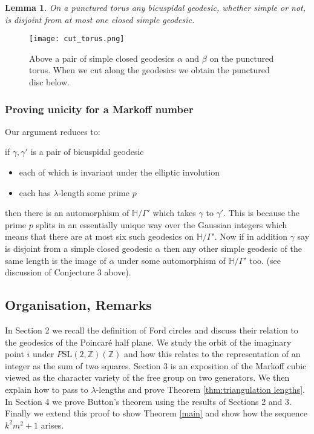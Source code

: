 \documentclass[12pt,a4paper]{amsart}
\newtheorem{lem}[thm]{Lemma}
\def\HH{\mathbb{H}}
\def\xx{\HH/\Gamma'}
\def\ZZ{\mathbb{Z}}
\def\sl2{\mathrm{SL}(2, \ZZ)}
\begin{document}
\begin{lem}\label{lem: labelling}
On a punctured torus any bicuspidal geodesic, whether simple or not, is
disjoint from at most one closed simple geodesic.
\end{lem}

\begin{figure}[ht]
\begin{center}
\texttt{[image: cut\_torus.png]}
\end{center}

\caption{Above a pair of simple closed geodesics $\alpha$ and $\beta$ on the
punctured torus. When we cut along the geodesics we obtain the punctured disc
below.}

	\label{fig: cut torus}
\end{figure}

\subsubsection{Proving unicity for a Markoff number} 
Our argument reduces to:

if $\gamma, \gamma'$ is a pair of  bicuspidal geodesic 

\begin{itemize}	
\item each of which is invariant under the elliptic involution 
\item each has  $\lambda$-length some prime $p$ 
\end{itemize}	

then there is an automorphism of $\xx$ which takes $\gamma$ to $\gamma'$. This
is because  the prime $p$ splits in an essentially unique way over the Gaussian
integers which means that there are at most six such geodesics on $\xx$. Now if
in addition $\gamma$ say is disjoint from a simple closed geodesic $\alpha$ then
any other simple geodesic of the same length is the image of $\alpha$ under
some automorphism of $\xx$ too. (see discussion of Conjecture 3 \cite{mcp}
above).

\subsection{Organisation, Remarks}

In Section 2 we recall the definition of Ford circles and discuss their
relation to the geodesics of the Poincaré half plane. We study the orbit of the
imaginary point $i$ under $P\sl2(\ZZ)$ and how this relates to the
representation of an integer as the sum of two squares. Section 3  is an
exposition of the Markoff cubic viewed as the character variety of the free
group on two generators. We then explain how to pass to $\lambda$-lengths and
prove Theorem \ref{thm:triangulation lengths}. In Section 4 we prove Button's
theorem using the results of Sections 2 and  3.  Finally we extend this proof
to show Theorem \ref{main} and show how the sequence $k^2m^2 + 1$ arises. 
\end{document}
